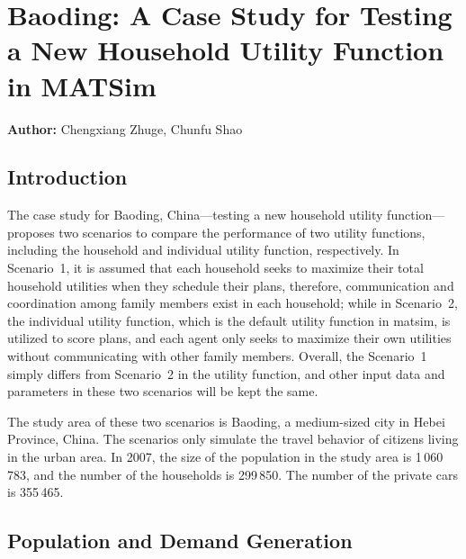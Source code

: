 \chapter{Baoding: A Case Study for Testing a New Household Utility Function in MATSim}
\label{ch:baoding}
\hfill \textbf{Author:} Chengxiang Zhuge, Chunfu Shao


\section{Introduction}
The case study for Baoding, China---testing a new household utility function---proposes two scenarios to compare the performance of two utility functions, including the household and individual utility function, respectively. 
In Scenario~1, it is assumed that each household seeks to maximize their total household utilities when they schedule their plans, therefore, communication and coordination among family members exist in each household; while in Scenario~2, the individual utility function, which is the default utility function in \gls{matsim}, is utilized to score plans, and each agent only seeks to maximize their own utilities without communicating with other family members. 
Overall, the Scenario~1 simply differs from Scenario~2 in the utility function, and other input data and parameters in these two scenarios will be kept the same. 

The study area of these two scenarios is Baoding, a medium-sized city in Hebei Province, China. 
The scenarios only simulate the travel behavior of citizens living in the urban area. 
In 2007, the size of the population in the study area is 1\,060\,783, and the number of the households is 299\,850.  
The number of the private cars is 355\,465. 

\section{Population and Demand Generation}

